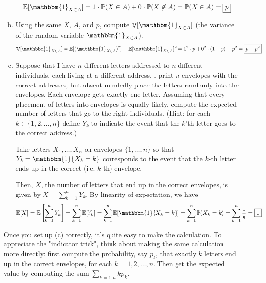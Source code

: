 \documentclass[12pt]{article}
\renewcommand{\P}{\mathbb{P}}
\newcommand{\E}{\mathbb{E}}
\newcommand{\ind}{\mathbbm{1}}
\DeclareMathOperator{\Var}{\mathbb{V}}
\begin{document}
\begin{enumerate}[1.]
\begin{enumerate}[(a)]
		            \color{blue}
		            \[\E [\ind_{X \in A}] = 1 \cdot \P(X \in A) + 0 \cdot \P(X \not\in A) = \P(X \in A) = \boxed{p}\]
		            \color{black}

		      \item Using the same $X$, $A$, and $p$, compute $\Var[\ind_{X \in A}]$ (the variance of the random variable $\ind_{X\in A}$).
		            \color{blue}
		            \[\Var[\ind_{X \in A}] = \E[(\ind_{X \in A})^2] - \E[\ind_{X \in A}]^2 = 1^2 \cdot p + 0^2 \cdot (1 - p) - p^2 = \boxed{p - p^2}\]

		            \color{black}

		      \item Suppose that I have $n$ different letters addressed to $n$ different individuals, each living at a different address. I print $n$ envelopes with the correct addresses, but absent-mindedly place the letters randomly into the envelopes. Each envelope gets exactly one letter. Assuming that every placement of letters into envelopes is equally likely, compute the expected number of letters that go to the right individuals. (Hint: for each $k\in\{1,2,\ldots,n\}$ define $Y_k$ to indicate the event that the $k$'th letter goes to the correct address.)

		            \color{blue}
		            Take letters $X_1, \dots, X_n$ on envelopes $\{1, \dots, n\}$ so that $Y_k = \ind\{X_k = k\}$ corresponds to the event that the $k$-th letter ends up in the correct (i.e. $k$-th) envelope.

		            Then, $X$, the number of letters that end up in the correct envelopes, is given by $X = \sum_{k=1}^n Y_k$. By linearity of expectation, we have
		            \[\E[X] = \E\left[\sum_{k=1}^n Y_k\right] = \sum_{k=1}^n \E[Y_k] = \sum_{k=1}^n \E[\ind\{X_k = k\}] = \sum_{k=1}^{n} \P(X_k = k) = \sum_{k=1}^{n} \frac{1}{n} = \boxed{1}\]
		            \color{black}


	      \end{enumerate}

	      Once you set up (c) correctly, it's quite easy to make the calculation. To appreciate the "indicator trick", think about making the same calculation more directly: first compute the probability, say $p_k$, that exactly $k$ letters end up in the correct envelopes, for each $k=1,2,\ldots,n$. Then get the expected value by computing the sum $\sum_{k=1:n} kp_k$.




	      \pagebreak


\end{enumerate}
\end{document}
